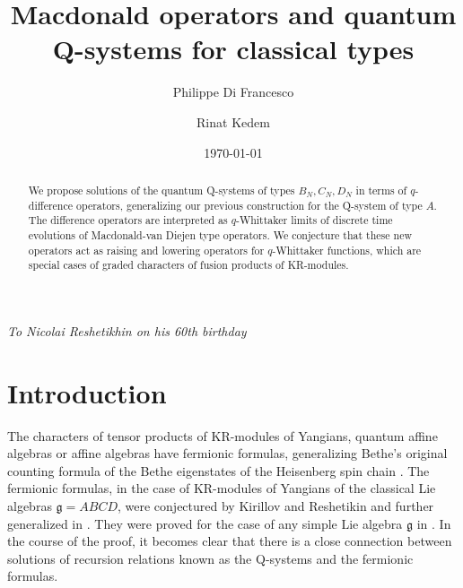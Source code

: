 \documentclass[12pt]{amsart}
\newcommand{\g}{{\mathfrak{g}}}
\numberwithin{equation}{section}
\numberwithin{table}{section}
\begin{document}
\title{Macdonald operators and quantum Q-systems for classical types}
\author{Philippe Di Francesco} 
\address{Department of Mathematics, University of Illinois MC-382, Urbana, IL 61821, 
U.S.A. e-mail: philippe@illinois.edu and 
Institut de Physique Th\'eorique du Commissariat \`a l'Energie Atomique, 
Unit\'e de Recherche associ\'ee du CNRS,
CEA Saclay/IPhT/Bat 774, F-91191 Gif sur Yvette Cedex, 
FRANCE. e-mail: philippe.di-francesco@cea.fr
}
\author{Rinat Kedem} 
\address{Department of Mathematics, University of Illinois MC-382, Urbana, IL 61821, 
U.S.A. e-mail: rinat@illinois.edu}

\begin{abstract}
We propose solutions of the quantum Q-systems of types $B_N,C_N,D_N$ in terms of 
$q$-difference operators, generalizing our previous construction for the Q-system of type $A$. The difference operators are interpreted as $q$-Whittaker limits of discrete time evolutions of  Macdonald-van Diejen type operators.
We  conjecture that these new operators act as raising and lowering operators for $q$-Whittaker 
functions, which are special cases of graded characters of fusion products of KR-modules.
\end{abstract}



\maketitle

\date{\today}

\centerline{\it To Nicolai Reshetikhin on his 60th birthday}



\section{Introduction}

The characters of  tensor products of KR-modules of Yangians, quantum affine algebras or affine algebras have fermionic formulas, generalizing Bethe's original counting formula of the Bethe eigenstates of the Heisenberg spin chain \cite{Bethe}. The fermionic formulas, in the case of KR-modules of Yangians of the classical Lie algebras $\g=ABCD$, were conjectured by Kirillov and Reshetikin \cite{KR} and further generalized in \cite{HKOTY}. They were proved for the case of any simple Lie algebra $\g$ in \cite{AK,DFK08}. In the course of the proof, it becomes clear that there is a close connection between solutions of recursion relations known as the Q-systems and the fermionic formulas.
\end{document}
